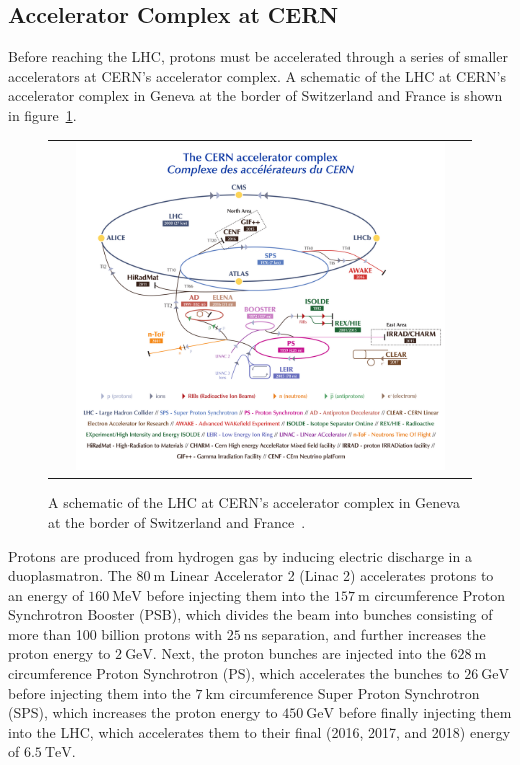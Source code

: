 \subsection{Accelerator Complex at CERN}
Before reaching the LHC, protons must be accelerated through a series of smaller accelerators at CERN's accelerator complex.
A schematic of the LHC at CERN's accelerator complex in Geneva at the border of Switzerland and France is shown in figure~\ref{CERN_LHC}.
\begin{figure}[htb]
  \begin{center}
    \begin{tabular}{c}
        \includegraphics[width=0.9\textwidth]{fig_LHC_CMS/CERN_LHC.pdf}
    \end{tabular}
    \caption{A schematic of the LHC at CERN's accelerator complex in Geneva at the border of Switzerland and France~\cite{Mobs:2197559}.
            }
    \label{CERN_LHC}
  \end{center}
\end{figure}
Protons are produced from hydrogen gas by inducing electric discharge in a duoplasmatron.
The $\SI{80}{\m}$ Linear Accelerator 2 (Linac 2) accelerates protons to an energy of $\SI{160}{\MeV}$ before injecting them into the $\SI{157}{\m}$ circumference Proton Synchrotron Booster (PSB), which divides the beam into bunches consisting of more than 100 billion protons with $\SI{25}{\ns}$ separation, and further increases the proton energy to $\SI{2}{\GeV}$.
Next, the proton bunches are injected into the $\SI{628}{\m}$ circumference Proton Synchrotron (PS), which accelerates the bunches to $\SI{26}{\GeV}$ before injecting them into the $\SI{7}{\km}$ circumference Super Proton Synchrotron (SPS), which increases the proton energy to $\SI{450}{\GeV}$ before finally injecting them into the LHC, which accelerates them to their final (2016, 2017, and 2018) energy of $\SI{6.5}{\TeV}$.

